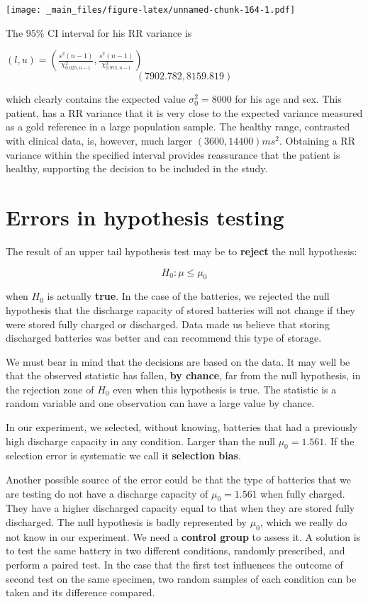 \documentclass[
]{book}
\begin{document}
\texttt{[image: \_main\_files/figure-latex/unnamed-chunk-164-1.pdf]}

The \(95\%\) CI interval for his RR variance is

\((l,u) = (\frac{s^2 (n-1)}{\chi^2_{0.025,n-1}},\frac{s^2(n-1)}{\chi^2_{0.975,n-1}})\)
\[( 7902.782, 8159.819)\]

which clearly contains the expected value \(\sigma^2_0=8000\) for his age and sex. This patient, has a RR variance that it is very close to the expected variance measured as a gold reference in a large population sample. The healthy range, contrasted with clinical data, is, however, much larger \((3600, 14400)ms^2\). Obtaining a RR variance within the specified interval provides reassurance that the patient is healthy, supporting the decision to be included in the study.

\hypertarget{errors-in-hypothesis-testing}{%
\section{Errors in hypothesis testing}\label{errors-in-hypothesis-testing}}

The result of an upper tail hypothesis test may be to \textbf{reject} the null hypothesis:

\[H_0: \mu\leq\mu_0\]

when \(H_0\) is actually \textbf{true}. In the case of the batteries, we rejected the null hypothesis that the discharge capacity of stored batteries will not change if they were stored fully charged or discharged. Data made us believe that storing discharged batteries was better and can recommend this type of storage.

We must bear in mind that the decisions are based on the data. It may well be that the observed statistic has fallen, \textbf{by chance}, far from the null hypothesis, in the rejection zone of \(H_0\) even when this hypothesis is true. The statistic is a random variable and one observation can have a large value by chance.

In our experiment, we selected, without knowing, batteries that had a previously high discharge capacity in any condition. Larger than the null \(\mu_0=1.561\). If the selection error is systematic we call it \textbf{selection bias}.

Another possible source of the error could be that the type of batteries that we are testing do not have a discharge capacity of \(\mu_0=1.561\) when fully charged. They have a higher discharged capacity equal to that when they are stored fully discharged. The null hypothesis is badly represented by \(\mu_0\), which we really do not know in our experiment. We need a \textbf{control group} to assess it. A solution is to test the same battery in two different conditions, randomly prescribed, and perform a paired test. In the case that the first test influences the outcome of second test on the same specimen, two random samples of each condition can be taken and its difference compared.
\end{document}

